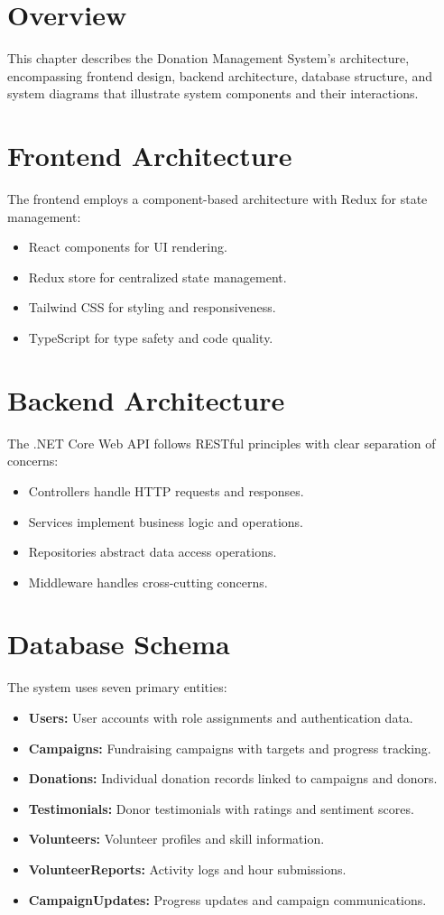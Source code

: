 \section{Overview}
This chapter describes the Donation Management System's architecture, encompassing frontend design, backend architecture, database structure, and system diagrams that illustrate system components and their interactions.

\section{Frontend Architecture}
The frontend employs a component-based architecture with Redux for state management:
\begin{itemize}
    \item React components for UI rendering.
    \item Redux store for centralized state management.
    \item Tailwind CSS for styling and responsiveness.
    \item TypeScript for type safety and code quality.
\end{itemize}

\section{Backend Architecture}
The .NET Core Web API follows RESTful principles with clear separation of concerns:
\begin{itemize}
    \item Controllers handle HTTP requests and responses.
    \item Services implement business logic and operations.
    \item Repositories abstract data access operations.
    \item Middleware handles cross-cutting concerns.
\end{itemize}

\section{Database Schema}
The system uses seven primary entities:
\begin{itemize}
    \item \textbf{Users:} User accounts with role assignments and authentication data.
    \item \textbf{Campaigns:} Fundraising campaigns with targets and progress tracking.
    \item \textbf{Donations:} Individual donation records linked to campaigns and donors.
    \item \textbf{Testimonials:} Donor testimonials with ratings and sentiment scores.
    \item \textbf{Volunteers:} Volunteer profiles and skill information.
    \item \textbf{VolunteerReports:} Activity logs and hour submissions.
    \item \textbf{CampaignUpdates:} Progress updates and campaign communications.
\end{itemize}

